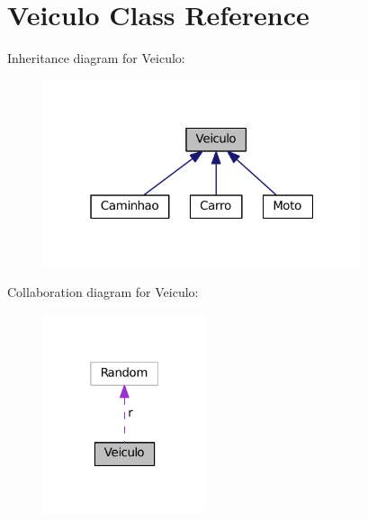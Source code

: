 \hypertarget{classVeiculo}{}\section{Veiculo Class Reference}
\label{classVeiculo}


Inheritance diagram for Veiculo\+:\nopagebreak
\begin{figure}[H]
\begin{center}
\leavevmode
\includegraphics[width=265pt]{classVeiculo__inherit__graph}
\end{center}
\end{figure}


Collaboration diagram for Veiculo\+:\nopagebreak
\begin{figure}[H]
\begin{center}
\leavevmode
\includegraphics[width=136pt]{classVeiculo__coll__graph}
\end{center}
\end{figure}
